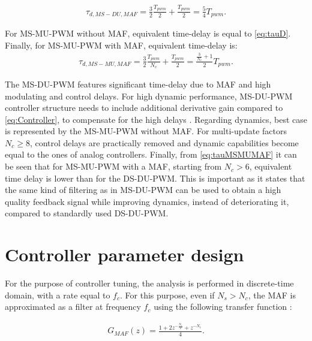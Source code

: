 \documentclass[conference]{IEEEtran}
\begin{document}
\begin{equation}
\begin{aligned}
\tau_{d,MS-DU,MAF} = \frac{3}{2} \frac{T_{pwm}}{2} + \frac{T_{pwm}}{2} = \frac{5}{4} T_{pwm}.
\label{eq:tauMSDU} 
\end{aligned}    
\end{equation}

For MS-MU-PWM without MAF, equivalent time-delay is equal to \eqref{eq:tauD}.
Finally, for MS-MU-PWM with MAF, equivalent time-delay is:
\begin{equation}
\begin{aligned}
\tau_{d,MS-MU,MAF} = \frac{3}{2} \frac{T_{pwm}}{N_c} + \frac{T_{pwm}}{2} = \frac{\frac{3}{N_c}+1}{2}T_{pwm}.
\label{eq:tauMSMUMAF} 
\end{aligned}    
\end{equation}

The MS-DU-PWM features significant time-delay due to MAF and high modulating and control delays. For high dynamic performance, MS-DU-PWM controller structure needs to include additional derivative gain compared to \eqref{eq:Controller}, to compensate for the high delays \cite{vuksa2016}. Regarding dynamics, best case is represented by the MS-MU-PWM without MAF. For multi-update factors $N_c \geq 8$, control delays are practically removed and dynamic capabilities become equal to the ones of analog controllers.
Finally, from \eqref{eq:tauMSMUMAF} it can be seen that for MS-MU-PWM with a MAF, starting from $N_c>6$, equivalent time delay is lower than for the DS-DU-PWM. This is important as it states that the same kind of filtering as in MS-DU-PWM can be used to obtain a high quality feedback signal while improving dynamics, instead of deteriorating it, compared to standardly used DS-DU-PWM.

\section{Controller parameter design}
For the purpose of controller tuning, the analysis is performed in discrete-time domain, with a rate equal to $f_c$. For this purpose, even if $N_s > N_c$, the MAF is approximated as a filter at frequency $f_c$ using the following transfer function \cite{vuksa2016}:

\begin{equation}
\begin{aligned}
G_{MAF}(z) = \frac{1 + 2z^{-\frac{N_c}{2}} + z^{-N_c}}{4}.
\label{eq:MAF} 
\end{aligned}    
\end{equation}
\end{document}
